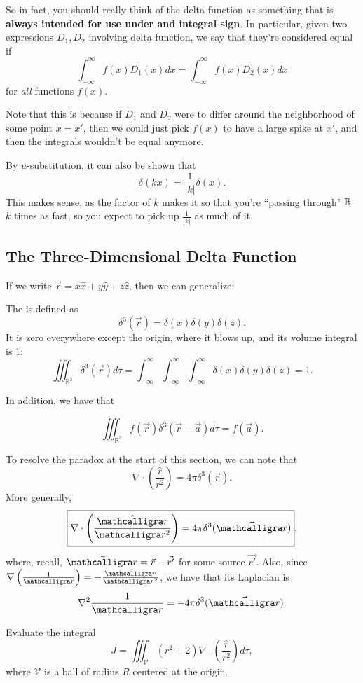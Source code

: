 So in fact, you should really think of the delta function as something that is \textbf{always intended for use under and integral sign}. In particular, given two expressions $D_1, D_2$ involving delta function, we say that they're considered equal if
\[\int_{-\infty}^\infty f(x)D_1(x)dx=\int_{-\infty}^\infty f(x)D_2(x)dx\]
for \textit{all} functions $f(x)$.

Note that this is because if $D_1$ and $D_2$ were to differ around the neighborhood of some point $x=x'$, then we could just pick $f(x)$ to have a large spike at $x'$, and then the integrals wouldn't be equal anymore.

By $u$-substitution, it can also be shown that
\[\delta(kx)=\frac{1}{|k|}\delta(x).\]
This makes sense, as the factor of $k$ makes it so that you're ``passing through" $\mathbb R$ $k$ times as fast, so you expect to pick up $\frac{1}{|k|}$ as much of it.

\subsection{The Three-Dimensional Delta Function}

If we write $\vec{r}=x\hat{x}+y\hat{y}+z\hat{z}$, then we can generalize:

\begin{definition}
    The  is defined as
    \[\delta^3(\vec{r})=\delta(x)\delta(y)\delta(z).\]
    It is zero everywhere except the origin, where it blows up, and its volume integral is 1:
    \[\iiint_{\mathbb{R}^3}\delta^3(\vec{r})d\tau=\int_{-\infty}^\infty\int_{-\infty}^\infty\int_{-\infty}^\infty\delta(x)\delta(y)\delta(z)=1.\]
\end{definition}

In addition, we have that

\[\boxed{\iiint_{\mathbb{R}^3}f(\vec{r})\delta^3(\vec{r}-\vec{a})d\tau=f(\vec{a})}.\]

To resolve the paradox at the start of this section, we can note that
\[\nabla\cdot\left(\frac{\hat{r}}{r^2}\right)=4\pi\delta^3(\vec{r}).\]
More generally,
\[\boxed{\nabla\cdot\left(\frac{\hat{\scr}}{\scr^2}\right)=4\pi\delta^3(\vec{\scr})},\]
where, recall, $\vec{\scr}=\vec{r}-\vec{r'}$ for some source $\vec{r'}$. Also, since $\nabla\left(\frac{1}{\scr}\right)=-\frac{\vec{\scr}}{\scr^2}$, we have that its Laplacian is
\[\nabla^2\frac{1}{\scr}=-4\pi\delta^3(\vec{\scr}).\]

\begin{example}
Evaluate the integral
\[J=\iiint_{\mathcal{V}}(r^2+2)\nabla\cdot\left(\frac{\hat{r}}{r^2}\right)d\tau,\]
where $\mathcal{V}$ is a ball of radius $R$ centered at the origin.
\end{example}

